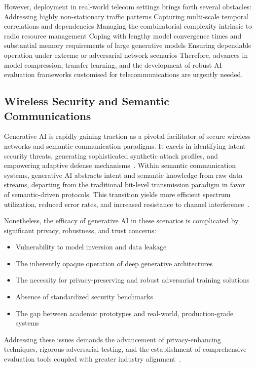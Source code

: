 \documentclass[sigconf]{acmart}
\begin{document}
However, deployment in real-world telecom settings brings forth several obstacles:
Addressing highly non-stationary traffic patterns
Capturing multi-scale temporal correlations and dependencies
Managing the combinatorial complexity intrinsic to radio resource management
Coping with lengthy model convergence times and substantial memory requirements of large generative models
Ensuring dependable operation under extreme or adversarial network scenarios
Therefore, advances in model compression, transfer learning, and the development of robust AI evaluation frameworks customised for telecommunications are urgently needed.

\subsection{Wireless Security and Semantic Communications}

Generative AI is rapidly gaining traction as a pivotal facilitator of secure wireless networks and semantic communication paradigms. It excels in identifying latent security threats, generating sophisticated synthetic attack profiles, and empowering adaptive defense mechanisms~\cite{ref15,ref26,ref44}. Within semantic communication systems, generative AI abstracts intent and semantic knowledge from raw data streams, departing from the traditional bit-level transmission paradigm in favor of semantic-driven protocols. This transition yields more efficient spectrum utilization, reduced error rates, and increased resistance to channel interference~\cite{ref15,ref26,ref44}.

Nonetheless, the efficacy of generative AI in these scenarios is complicated by significant privacy, robustness, and trust concerns:
\begin{itemize}
    \item Vulnerability to model inversion and data leakage
    \item The inherently opaque operation of deep generative architectures
    \item The necessity for privacy-preserving and robust adversarial training solutions
    \item Absence of standardized security benchmarks
    \item The gap between academic prototypes and real-world, production-grade systems
\end{itemize}
Addressing these issues demands the advancement of privacy-enhancing techniques, rigorous adversarial testing, and the establishment of comprehensive evaluation tools coupled with greater industry alignment~\cite{ref46,ref49}.
\end{document}
